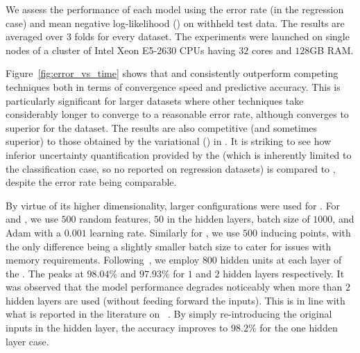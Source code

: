 We assess the performance of each model %
using the error rate (\rmse in the regression case) and mean negative log-likelihood (\mnll) on withheld test data.
The results are averaged over $3$ folds for every dataset.
The experiments were launched on single nodes of a cluster of Intel Xeon E5-2630 CPUs having $32$ cores and $128$GB RAM.
 
Figure~\ref{fig:error_vs_time} shows that \dgprbf and \dgparc consistently outperform competing techniques both in terms of convergence speed and  predictive accuracy.
This is particularly significant for larger datasets where other techniques take considerably longer to converge to a reasonable error rate, although \dgpep converges to  superior \mnll for the \protein dataset.
The results are also competitive (and sometimes superior) to those obtained by the variational \gp (\vargp) in \citet{HensmanMG15}. 
It is striking to see how inferior uncertainty quantification provided by the \dnn (which is inherently limited to the classification case, so no \mnll reported on regression datasets) is compared to , despite the error rate being comparable. %
 
By virtue of its higher dimensionality, larger configurations were used for \mnist.
For \dgprbf and \dgparc, we use $500$ random features, $50$  in the hidden layers, batch size of $1000$, and Adam with a $0.001$ learning rate. %
Similarly for \dgpep, we use $500$ inducing points, with the only difference being a slightly smaller batch size to cater for issues with memory requirements.
Following~\citet{Simard03}, we employ $800$ hidden units at each layer of the \dnn.
The \dgprbf peaks at $98.04\%$ and $97.93\%$ for $1$ and $2$ hidden layers respectively.
It was observed that the model performance degrades noticeably when more than $2$ hidden layers are used (without feeding forward the inputs).
This is in line with what is reported in the literature on ~\citep{Neal96,Duvenaud14}.
By simply re-introducing the original inputs in the hidden layer, the accuracy improves to $98.2\%$ for the one hidden layer case. %

